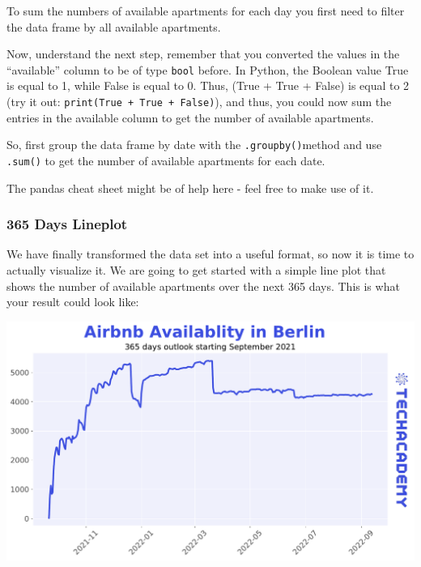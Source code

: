 \documentclass[
  11pt,
]{article}
\newenvironment{tipsp}[1]
  {
  \begin{itemize}
  \footnotesize
  \renewcommand{\labelitemi}{
    \raisebox{-.7\height}[0pt][0pt]{
      {\setkeys{Gin}{width=3em,keepaspectratio}
        \texttt{[image: images/\#1.png]}}
    }
  }
  \setlength{\fboxsep}{1em}
  \begin{pbox}
  \item
  }
  {
  \end{pbox}
  \end{itemize}
  }
\begin{document}
\begin{tipsp}p
To sum the numbers of available apartments for each day you first need to filter the data frame by all available apartments.

Now, understand the next step, remember that you converted the values in the ``available'' column to be of type \texttt{bool} before. In Python, the Boolean value True is equal to 1, while False is equal to 0. Thus, (True + True + False) is equal to 2 (try it out: \texttt{print(True\ +\ True\ +\ False)}), and thus, you could now sum the entries in the available column to get the number of available apartments.

So, first group the data frame by date with the \texttt{.groupby()}method and use \texttt{.sum()} to get the number of available apartments for each date.

The pandas cheat sheet might be of help here - feel free to make use of it.

\end{tipsp}

\hypertarget{days-lineplot}{%
\subsubsection{365 Days Lineplot}\label{days-lineplot}}

We have finally transformed the data set into a useful format, so now it is time to actually visualize it. We are going to get started with a simple line plot that shows the number of available apartments over the next 365 days. This is what your result could look like:

\begin{center}\includegraphics[width=1\linewidth]{plot/01_python/availability} \end{center}
\end{document}
